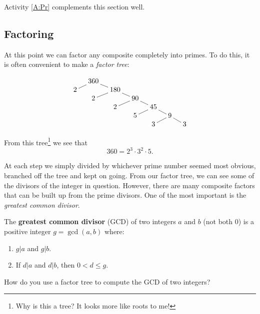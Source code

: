 \begin{activitynote}
Activity \ref{A:Pr} complements this section well.  %
\end{activitynote}


\subsection{Factoring}

At this point we can factor any composite completely into primes. To
do this, it is often convenient to make a \textit{factor
  tree}:

\[
\xymatrix@R=0pt@C=10pt{
  & 360 \ar@{-}[dl] \ar@{-}[dr] & & & & &\\
2 &     & 180 \ar@{-}[dl] \ar@{-}[dr] & & & & \\ 
  &  2   &     & 90 \ar@{-}[dl] \ar@{-}[dr] & & & \\
  &      &  2  &    & 45  \ar@{-}[dl] \ar@{-}[dr] & & \\ 
  &      &     & 5  &    & 9 \ar@{-}[dl] \ar@{-}[dr] &\\ 
  &      &     &    &  3  &  & 3
}
\]

From this tree\footnote{Why is this a tree? It looks more like roots to me!} we see that
\[
360 = 2^3 \cdot 3^2 \cdot 5.
\]

At each step we simply divided by whichever prime number seemed most
obvious, branched off the tree and kept on going. From our factor
tree, we can see some of the divisors of the integer in
question. However, there are many composite factors that can be built
up from the prime divisors. One of the most important is the
\textit{greatest common divisor}.

\begin{definition} 
The \textbf{greatest common divisor} (GCD) of two integers $a$ and $b$ (not both 0)
is a positive integer $g = \gcd(a,b)$ where:
\begin{enumerate}
\item $g|a$ and $g|b$.
\item If $d|a$ and $d|b$, then $0 < d \le g$.
\end{enumerate}
\end{definition}

\begin{question}
How do you use a factor tree to compute the GCD of two integers?
\end{question}
\QM



